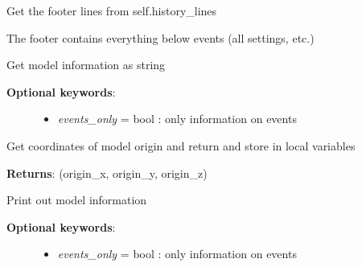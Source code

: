 \documentclass[a4paper,10pt,english]{sphinxmanual}
\begin{document}
\begin{fulllineitems}
\begin{fulllineitems}
\end{fulllineitems}


\begin{fulllineitems}
\label{pynoddy:pynoddy.history.NoddyHistory.get_footer_lines}
Get the footer lines from self.history\_lines

The footer contains everything below events (all settings, etc.)

\end{fulllineitems}


\begin{fulllineitems}
\label{pynoddy:pynoddy.history.NoddyHistory.get_info_string}
Get model information as string
\begin{description}
\item[{\textbf{Optional keywords}:}] \leavevmode\begin{itemize}
\item {} 
\emph{events\_only} = bool : only information on events

\end{itemize}

\end{description}

\end{fulllineitems}


\begin{fulllineitems}
\label{pynoddy:pynoddy.history.NoddyHistory.get_origin}
Get coordinates of model origin and return and store in local variables

\textbf{Returns}: (origin\_x, origin\_y, origin\_z)

\end{fulllineitems}


\begin{fulllineitems}
\label{pynoddy:pynoddy.history.NoddyHistory.info}
Print out model information
\begin{description}
\item[{\textbf{Optional keywords}:}] \leavevmode\begin{itemize}
\item {} 
\emph{events\_only} = bool : only information on events


\end{itemize}
\end{description}
\end{fulllineitems}
\end{fulllineitems}
\end{document}
